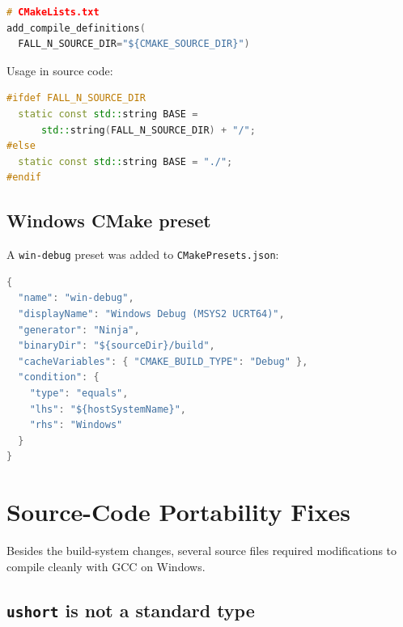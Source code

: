 \begin{lstlisting}[language=C++, basicstyle=\ttfamily\small,
    frame=single, framerule=0.4pt, rulecolor=\color{gray!50},
    breaklines=true, showstringspaces=false]
# CMakeLists.txt
add_compile_definitions(
  FALL_N_SOURCE_DIR="${CMAKE_SOURCE_DIR}")
\end{lstlisting}

Usage in source code:
\begin{lstlisting}[language=C++, basicstyle=\ttfamily\small,
    frame=single, framerule=0.4pt, rulecolor=\color{gray!50},
    breaklines=true, showstringspaces=false]
#ifdef FALL_N_SOURCE_DIR
  static const std::string BASE =
      std::string(FALL_N_SOURCE_DIR) + "/";
#else
  static const std::string BASE = "./";
#endif
\end{lstlisting}

\subsection{Windows CMake preset}

A \texttt{win-debug} preset was added to \texttt{CMakePresets.json}:
\begin{lstlisting}[language=C++, basicstyle=\ttfamily\small,
    frame=single, framerule=0.4pt, rulecolor=\color{gray!50},
    breaklines=true, showstringspaces=false]
{
  "name": "win-debug",
  "displayName": "Windows Debug (MSYS2 UCRT64)",
  "generator": "Ninja",
  "binaryDir": "${sourceDir}/build",
  "cacheVariables": { "CMAKE_BUILD_TYPE": "Debug" },
  "condition": {
    "type": "equals",
    "lhs": "${hostSystemName}",
    "rhs": "Windows"
  }
}
\end{lstlisting}

\section{Source-Code Portability Fixes}
\label{sec:win-src-fixes}

Besides the build-system changes, several source files required modifications
to compile cleanly with GCC on Windows.

\subsection{\texttt{ushort} is not a standard type}

